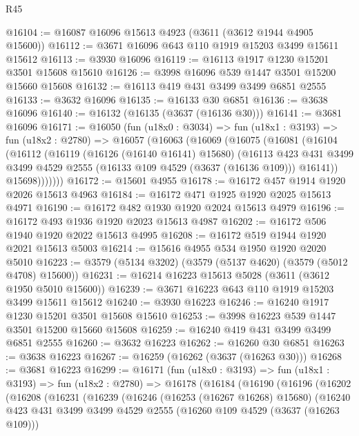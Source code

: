 \begin{lexlean}{R45}
\begin{coremodule}
@16104 := @16087 @16096 @15613 @4923 (@3611 (@3612 @1944 @4905 @15600))
@16112 := @3671 @16096 @643 @110 @1919 @15203 @3499 @15611 @15612
@16113 := @3930 @16096
@16119 := @16113 @1917 @1230 @15201 @3501 @15608 @15610
@16126 := @3998 @16096 @539 @1447 @3501 @15200 @15660 @15608
@16132 := @16113 @419 @431 @3499 @3499 @6851 @2555
@16133 := @3632 @16096
@16135 := @16133 @30 @6851
@16136 := @3638 @16096
@16140 := @16132 (@16135 (@3637 (@16136 @30)))
@16141 := @3681 @16096
@16171 := @16050
    (fun (u18x0 : @3034) =>
    fun (u18x1 : @3193) =>
    fun (u18x2 : @2780) =>
    @16057
      (@16063
        (@16069
          (@16075
            (@16081
              (@16104
                (@16112
                  (@16119
                    (@16126 (@16140 @16141) @15680)
                    (@16113
                      @423
                      @431
                      @3499
                      @3499
                      @4529
                      @2555
                      (@16133 @109 @4529 (@3637 (@16136 @109)))
                      @16141))
                  @15698)))))))
@16172 := @15601 @4955
@16178 := @16172 @457 @1914 @1920 @2026 @15613 @4963
@16184 := @16172 @471 @1925 @1920 @2025 @15613 @4971
@16190 := @16172 @482 @1930 @1920 @2024 @15613 @4979
@16196 := @16172 @493 @1936 @1920 @2023 @15613 @4987
@16202 := @16172 @506 @1940 @1920 @2022 @15613 @4995
@16208 := @16172 @519 @1944 @1920 @2021 @15613 @5003
@16214 := @15616 @4955 @534 @1950 @1920 @2020 @5010
@16223 := @3579 (@5134 @3202) (@3579 (@5137 @4620) (@3579 (@5012 @4708) @15600))
@16231 := @16214 @16223 @15613 @5028 (@3611 (@3612 @1950 @5010 @15600))
@16239 := @3671 @16223 @643 @110 @1919 @15203 @3499 @15611 @15612
@16240 := @3930 @16223
@16246 := @16240 @1917 @1230 @15201 @3501 @15608 @15610
@16253 := @3998 @16223 @539 @1447 @3501 @15200 @15660 @15608
@16259 := @16240 @419 @431 @3499 @3499 @6851 @2555
@16260 := @3632 @16223
@16262 := @16260 @30 @6851
@16263 := @3638 @16223
@16267 := @16259 (@16262 (@3637 (@16263 @30)))
@16268 := @3681 @16223
@16299 := @16171
    (fun (u18x0 : @3193) =>
    fun (u18x1 : @3193) =>
    fun (u18x2 : @2780) =>
    @16178
      (@16184
        (@16190
          (@16196
            (@16202
              (@16208
                (@16231
                  (@16239
                    (@16246
                      (@16253 (@16267 @16268) @15680)
                      (@16240
                        @423
                        @431
                        @3499
                        @3499
                        @4529
                        @2555
                        (@16260 @109 @4529 (@3637 (@16263 @109)))

\end{coremodule}
\end{lexlean}
